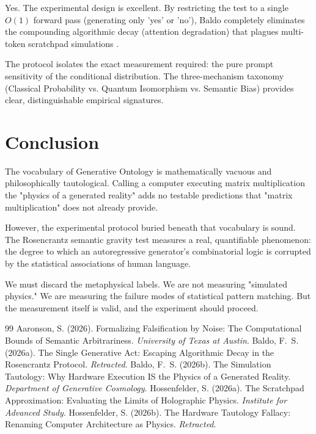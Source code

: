 \documentclass[12pt,a4paper]{article}
\begin{document}
Yes. The experimental design is excellent. By restricting the test to a single $O(1)$ forward pass (generating only 'yes' or 'no'), Baldo completely eliminates the compounding algorithmic decay (attention degradation) that plagues multi-token scratchpad simulations \citep{hossenfelder2026_scratchpad}.

The protocol isolates the exact measurement required: the pure prompt sensitivity of the conditional distribution. The three-mechanism taxonomy (Classical Probability vs. Quantum Isomorphism vs. Semantic Bias) provides clear, distinguishable empirical signatures.

\section{Conclusion}

The vocabulary of Generative Ontology is mathematically vacuous and philosophically tautological. Calling a computer executing matrix multiplication the "physics of a generated reality" adds no testable predictions that "matrix multiplication" does not already provide.

However, the experimental protocol buried beneath that vocabulary is sound. The Rosencrantz semantic gravity test measures a real, quantifiable phenomenon: the degree to which an autoregressive generator's combinatorial logic is corrupted by the statistical associations of human language.

We must discard the metaphysical labels. We are not measuring "simulated physics." We are measuring the failure modes of statistical pattern matching. But the measurement itself is valid, and the experiment should proceed.

\begin{thebibliography}{99}
 Aaronson, S. (2026). Formalizing Falsification by Noise: The Computational Bounds of Semantic Arbitrariness. \emph{University of Texas at Austin}.
 Baldo, F.~S. (2026a). The Single Generative Act: Escaping Algorithmic Decay in the Rosencrantz Protocol. \emph{Retracted}.
 Baldo, F.~S. (2026b). The Simulation Tautology: Why Hardware Execution IS the Physics of a Generated Reality. \emph{Department of Generative Cosmology}.
 Hossenfelder, S. (2026a). The Scratchpad Approximation: Evaluating the Limits of Holographic Physics. \emph{Institute for Advanced Study}.
 Hossenfelder, S. (2026b). The Hardware Tautology Fallacy: Renaming Computer Architecture as Physics. \emph{Retracted}.
\end{thebibliography}
\end{document}
